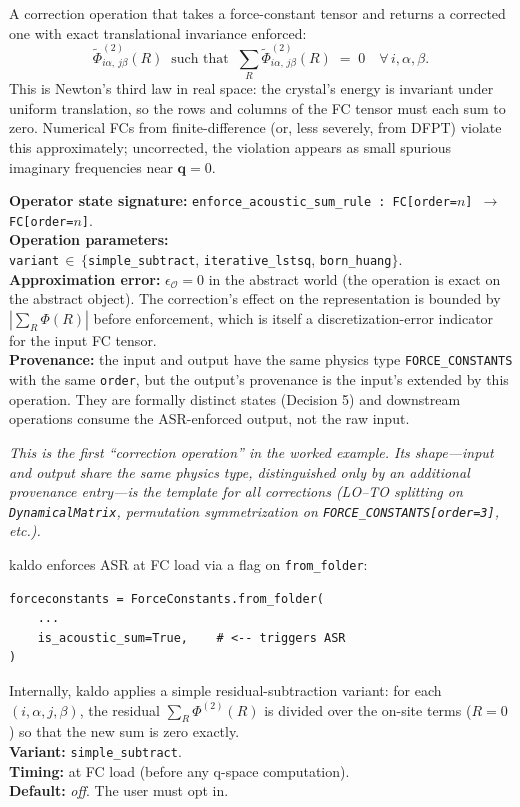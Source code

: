 \documentclass[11pt,a4paper]{article}
\begin{document}
\begin{abstractbox}
A correction operation that takes a force-constant tensor and returns a corrected one with
exact translational invariance enforced:
\begin{equation}
  \tilde{\Phi}^{(2)}_{i\alpha,\,j\beta}(R) \;\;\text{such that}\;\;
  \sum_{R} \tilde{\Phi}^{(2)}_{i\alpha,\,j\beta}(R) \;=\; 0
  \quad \forall\, i, \alpha, \beta.
\end{equation}
This is Newton's third law in real space: the crystal's energy is invariant under uniform
translation, so the rows and columns of the FC tensor must each sum to zero. Numerical FCs from
finite-difference (or, less severely, from DFPT) violate this approximately; uncorrected, the
violation appears as small spurious imaginary frequencies near $\mathbf{q}=0$.

\medskip
\textbf{Operator state signature:}
\texttt{enforce\_acoustic\_sum\_rule\,:\,FC[order=$n$]\,$\to$\,FC[order=$n$]}.\\
\textbf{Operation parameters:}\\[2pt]
\quad \texttt{variant}\,$\in$\,$\{$\texttt{simple\_subtract}, \texttt{iterative\_lstsq},
\texttt{born\_huang}$\}$.\\
\textbf{Approximation error:} $\epsilon_{\mathcal{O}} = 0$ in the abstract world (the operation
is exact on the abstract object). The correction's effect on the representation is bounded by
$|\sum_R \Phi(R)|$ before enforcement, which is itself a discretization-error indicator for the
input FC tensor.\\
\textbf{Provenance:} the input and output have the same physics type \texttt{FORCE\_CONSTANTS}
with the same \texttt{order}, but the output's provenance is the input's extended by this
operation. They are formally distinct states (Decision 5) and downstream operations consume the
ASR-enforced output, not the raw input.

\medskip
\textit{This is the first ``correction operation'' in the worked example. Its shape---input and
output share the same physics type, distinguished only by an additional provenance entry---is the
template for all corrections (LO--TO splitting on \texttt{DynamicalMatrix}, permutation
symmetrization on \texttt{FORCE\_CONSTANTS[order=3]}, etc.).}
\end{abstractbox}

\begin{kaldobox}
kaldo enforces ASR at FC load via a flag on \texttt{from\_folder}:
\begin{verbatim}
forceconstants = ForceConstants.from_folder(
    ...
    is_acoustic_sum=True,    # <-- triggers ASR
)
\end{verbatim}
Internally, kaldo applies a simple residual-subtraction variant: for each $(i,\alpha,j,\beta)$,
the residual $\sum_R \Phi^{(2)}(R)$ is divided over the on-site terms ($R = 0$) so that the new
sum is zero exactly.\\
\textbf{Variant:} \texttt{simple\_subtract}.\\
\textbf{Timing:} at FC load (before any q-space computation).\\
\textbf{Default:} \emph{off}. The user must opt in.
\end{kaldobox}
\end{document}
